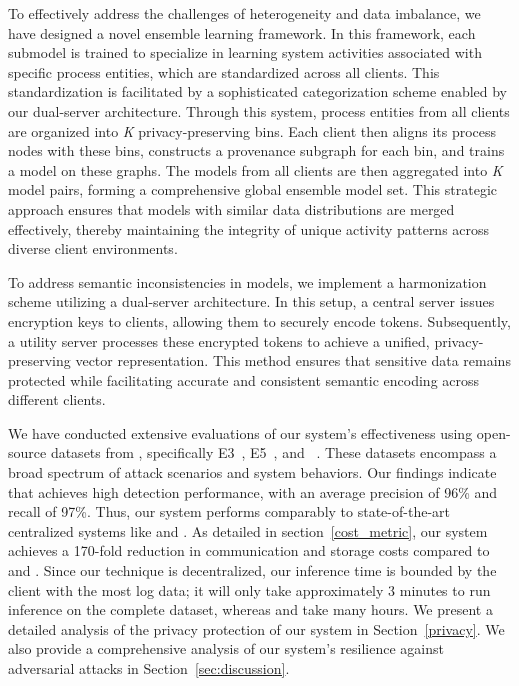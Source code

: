 To effectively address the challenges of heterogeneity and data imbalance, we have designed a novel ensemble learning framework. In this framework, each submodel is trained to specialize in learning system activities associated with specific process entities, which are standardized across all clients. This standardization is facilitated by a sophisticated categorization scheme enabled by our dual-server architecture. Through this system, process entities from all clients are organized into \textit{K} privacy-preserving bins. Each client then aligns its process nodes with these bins, constructs a provenance subgraph for each bin, and trains a \gnnshort model on these graphs. The models from all clients are then aggregated into \textit{K} model pairs, forming a comprehensive global ensemble model set. This strategic approach ensures that models with similar data distributions are merged effectively, thereby maintaining the integrity of unique activity patterns across diverse client environments.

To address semantic inconsistencies in \wordvec models, we implement a \wordvec harmonization scheme utilizing a dual-server architecture. In this setup, a central server issues encryption keys to clients, allowing them to securely encode \wordvec tokens. Subsequently, a utility server processes these encrypted tokens to achieve a unified, privacy-preserving vector representation. This method ensures that sensitive data remains protected while facilitating accurate and consistent semantic encoding across different clients.





We have conducted extensive evaluations of our system's effectiveness using open-source datasets from \darpa, specifically E3~\cite{error3}, E5~\cite{bug5}, and \optc~\cite{anjum2021analyzing}. These datasets encompass a broad spectrum of attack scenarios and system behaviors. Our findings indicate that \Sys achieves high detection performance, with an average precision of 96\% and recall of 97\%. Thus, our system performs comparably to state-of-the-art centralized systems like \flash and \kairos. As detailed in section~\ref{cost_metric}, our system achieves a 170-fold reduction in communication and storage costs compared to \flash and \kairos. Since our technique is decentralized, our inference time is bounded by the client with the most log data; it will only take approximately 3 minutes to run inference on the complete \optc dataset, whereas \flash and \kairos take many hours.  We present a detailed analysis of the privacy protection of our system in Section~\ref{privacy}. We also provide a comprehensive analysis of our system's resilience against adversarial attacks in Section~\ref{sec:discussion}.

